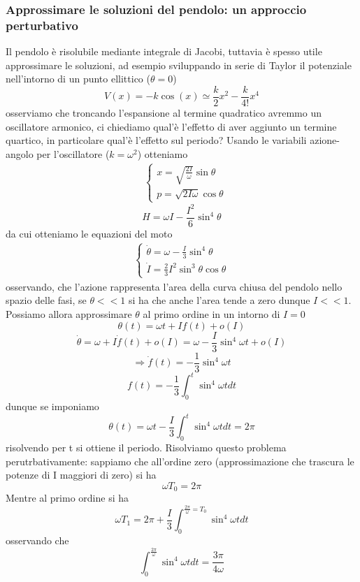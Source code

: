 \documentclass[
10pt, %
a4paper, %
oneside, %
headinclude,footinclude, %
BCOR5mm, %
]{scrartcl}
\begin{document}
\subsubsection{Approssimare le soluzioni del pendolo: un approccio perturbativo}
Il pendolo è risolubile mediante integrale di Jacobi, tuttavia è spesso utile approssimare le soluzioni, ad esempio sviluppando in serie di Taylor il potenziale nell'intorno di un punto ellittico (\(\theta = 0\))
\[V(x) = -k\cos(x)\simeq \frac{k}{2} x^2 -\frac{k}{4!}x^4\] 
osserviamo che troncando l'espansione al termine quadratico avremmo un oscillatore armonico, ci chiediamo qual'è l'effetto di aver aggiunto un termine quartico, in particolare qual'è l'effetto sul periodo? Usando le variabili azione-angolo per l'oscillatore (\(k = \omega^2\)) otteniamo
\begin{align*}
	&\begin{cases}
		x = \sqrt{\frac{2I}{\omega}}\sin\theta\\
		p = \sqrt{2I\omega}\cos\theta
	\end{cases}
\end{align*}
\[H = \omega I -\frac{I^2}{6}\sin^4\theta\] 
da cui otteniamo le equazioni del moto
\begin{align*}
	\begin{cases}
		\dot{\theta} = \omega -\frac{I}{3}\sin^4\theta\\
		\dot{I} = \frac{2}{3}I^2\sin^3\theta\cos\theta
	\end{cases}
\end{align*}
osservando, che l'azione rappresenta l'area della curva chiusa del pendolo nello spazio delle fasi, se \(\theta << 1\) si ha che anche l'area tende a zero dunque \(I << 1\). Possiamo allora approssimare $\theta$ al primo ordine in un intorno di \(I = 0\)
\[\theta(t) = \omega t + I f(t)+ o(I)\]
\[\dot{\theta} = \omega + I\dot{f}(t)+o(I)=\omega - \frac{I}{3}\sin^4\omega t + o(I)\]
\[\Rightarrow \dot{f}(t) = - \frac{1}{3}\sin^4\omega t\]
\[f(t) = - \frac{1}{3}\int_0^{t}\sin^4\omega t dt\]
dunque se imponiamo
\[\theta(t) = \omega t -\frac{I}{3}\int_0^{t}\sin^4\omega t dt = 2\pi \]
risolvendo per t si ottiene il periodo. Risolviamo questo problema perutrbativamente: sappiamo che all'ordine zero (approssimazione che trascura le potenze di I maggiori di zero) si ha
\[\omega T_0 = 2\pi\]
Mentre al primo ordine si ha
\[ \omega T_1 = 2\pi + \frac{I}{3}\int_{0}^{\frac{2\pi}{\omega} = T_0}\sin^4\omega t dt\]
osservando che 
\[\int_{0}^{\frac{2\pi}{\omega}}\sin^4\omega t dt = \frac{3\pi}{4\omega}\]
\end{document}
